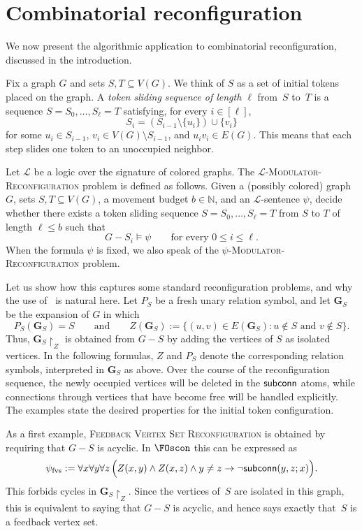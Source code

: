 \documentclass[1p,number,11pt]{elsarticle}
\newcommand{\scon}{\hbox{\sf subconn}}
\newcommand{\N}{\mathbb{N}}
\theoremstyle{plain}
\renewcommand{\le}{\leqslant}
\begin{document}
\section{Combinatorial reconfiguration}\label{sec:reconfiguration}
\newcommand{\legal}{\mathrm{legal}}

We now present the algorithmic application to combinatorial reconfiguration, discussed in the introduction. 

Fix a graph $G$ and sets $S,T\subseteq V(G)$. We think of $S$ as a set of
initial tokens placed on the graph. A \emph{token sliding sequence of length
$\ell$} from~$S$ to~$T$ is a sequence $S=S_0,\dots,S_\ell=T$ satisfying, for
every $i\in[\ell]$,
\[
    S_i=(S_{i-1}\setminus\{u_i\})\cup\{v_i\}
\]
for some $u_i\in S_{i-1}$, $v_i\in V(G)\setminus S_{i-1}$, and
$u_iv_i\in E(G)$. This means that each step slides one token to an unoccupied
neighbor.

Let $\mathcal L$ be a logic over the signature of colored graphs.
The \textsc{$\mathcal L$-Modulator-Reconfiguration} problem is defined as follows.
Given a (possibly colored) graph $G$, sets $S,T\subseteq V(G)$, a movement budget $b\in\N$, and an $\mathcal L$-sentence $\psi$, decide whether there exists a token sliding sequence $S=S_0,\dots,S_\ell=T$ from $S$ to $T$ of length $\ell\le b$ such that
\[
G - S_i \models \psi
\qquad\text{for every } 0\le i\le\ell .
\]
When the formula $\psi$ is fixed, we also speak of the \textsc{$\psi$-Modulator-Reconfiguration} problem.

\medskip 

Let us show how this captures some standard reconfiguration problems, and why
the use of \FOscon\ is natural here. Let $P_S$ be a fresh unary relation
symbol, and let $\mathbf G_S$ be the expansion of $G$ in which
\[
    P_S(\mathbf G_S)=S
    \qquad\text{and}\qquad
    Z(\mathbf G_S)
    :=
    \{(u,v)\in E(\mathbf G_S) : u\notin S \text{ and } v\notin S\}.
\]
Thus, $\mathbf G_S\!\upharpoonright_Z$ is obtained from $G-S$ by adding the vertices of
$S$ as isolated vertices. In the following formulas, $Z$ and $P_S$ denote
the corresponding relation symbols, interpreted in $\mathbf G_S$ as above.
Over the course of the reconfiguration sequence, the newly occupied vertices
will be deleted in the $\scon$ atoms, while connections through vertices that
have become free will be handled explicitly. The examples state the desired
properties for the initial token configuration.

As a first example, \textsc{Feedback Vertex Set Reconfiguration} is obtained by requiring that
$G-S$ is acyclic.  In $\FOscon$ this can be expressed as
\[
    \psi_{\mathrm{fvs}}
    :=
    \forall x\forall y\forall z\,
    \Bigl(
        Z(x,y)\wedge Z(x,z)\wedge y\neq z
        \rightarrow
        \neg \scon(y,z;x)
    \Bigr).
\]
This forbids cycles in $\mathbf G_S\!\upharpoonright_Z$. Since the vertices of~$S$ are
isolated in this graph, this is equivalent to saying that $G-S$ is acyclic,
and hence says exactly that~$S$ is a feedback vertex set.
\end{document}
